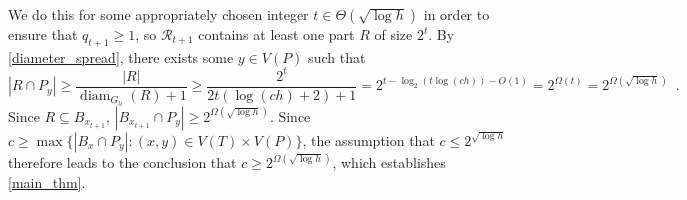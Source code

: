 \documentclass{patmorin}
\DeclareMathOperator{\diam}{diam}
\renewcommand{\le}{\leqslant}
\renewcommand{\ge}{\geqslant}
\begin{document}
We do this for some appropriately chosen integer $t\in\Theta(\sqrt{\log h})$ in order to ensure that $q_{t+1}\ge 1$, so $\mathcal{R}_{t+1}$ contains at least one part $R$ of size $2^t$.
%
%
%
%
%
By \cref{diameter_spread}, there exists some $y \in V(P)$ such that
\[
  |R\cap P_y| \ge \frac{|R|}{\diam_{G_h}(R)+1} \ge \frac{2^t}{2t(\log(ch)+2)+1}
  = 2^{t-\log_2(t\log(ch))-O(1)} =  2^{\Omega(t)} = 2^{\Omega(\sqrt{\log h})} \enspace .
\]
Since $R\subseteq B_{x_{t+1}}$, $|B_{x_{t+1}}\cap P_y|\ge 2^{\Omega(\sqrt{\log h})}$. Since $c\ge \max\{|B_x\cap P_y|:(x,y)\in V(T)\times V(P)\}$, the assumption that $c\le 2^{\sqrt{\log h}}$ therefore leads to the conclusion that $c\ge 2^{\Omega(\sqrt{\log h})}$, which establishes \cref{main_thm}.
\end{document}
